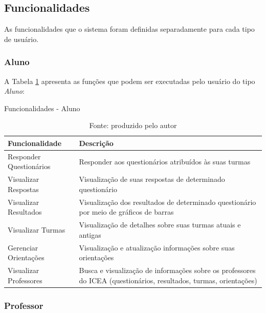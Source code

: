 \documentclass[
  12pt,       %
  openright,      %
  oneside,      %
  a4paper,      %
  english,      %
  french,        %
  spanish,     %
  brazil        %
  ]{abntex2-decsi}
\begin{document}
    \newpage
    
    \subsection{Funcionalidades}

    As funcionalidades que o sistema foram definidas separadamente para cada tipo de usuário.

    \newpage
    
    \subsubsection{Aluno}

    A Tabela \ref{tab:funcoes-aluno} apresenta as funções que podem ser executadas pelo usuário do tipo \textit{Aluno}: 

    \begin{table}[h]
    \centering
    \caption{Funcionalidades - Aluno}
    \begin{tabular}{p{5cm} p{10cm}}
    \hline
    Funcionalidade & Descrição \\
    \hline
    \hline
    Responder Questionários & Responder aos questionários atribuídos às suas turmas\\
    \hline
    Visualizar Respostas & Visualização de suas respostas de determinado questionário\\
    \hline
    Visualizar Resultados & Visualização dos resultados de determinado questionário por meio de gráficos de barras\\
    \hline
    Visualizar Turmas & Visualização de detalhes sobre suas turmas atuais e antigas\\
    \hline
    Gerenciar Orientações & Visualização e atualização informações sobre suas orientações\\
    \hline
    Visualizar Professores & Busca e visualização de informações sobre os professores do ICEA (questionários, resultados, turmas, orientações)\\
    \hline
    \end{tabular}
    \caption*{Fonte: produzido pelo autor}
    \label{tab:funcoes-aluno}
    \end{table}
	
    \newpage
    
    \subsubsection{Professor}
\end{document}
